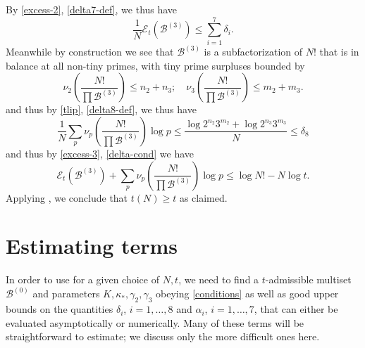 \documentclass[12pt,a4paper,reqno]{amsart}
\numberwithin{equation}{section}
\theoremstyle{plain}
\theoremstyle{definition}
\newcommand\tuple{{\mathcal B}}
\newcommand\excess{{\mathcal{E}}}
\begin{document}
By \eqref{excess-2}, \eqref{delta7-def}, we thus have
\begin{equation}\label{excess-3}
 \frac{1}{N} \excess_t(\tuple^{(3)}) \leq \sum_{i=1}^7 \delta_i.
\end{equation}
Meanwhile by construction we see that $\tuple^{(3)}$ is a subfactorization of $N!$ that is in balance at all non-tiny primes, with tiny prime surpluses bounded by
$$ \nu_2\left( \frac{N!}{\prod \tuple^{(3)}}\right) \leq n_2+n_3; \quad \nu_3\left( \frac{N!}{\prod \tuple^{(3)}}\right) \leq m_2+m_3.$$
and thus by \eqref{tlip}, \eqref{delta8-def}, we thus have
$$ \frac{1}{N} \sum_p \nu_p\left( \frac{N!}{\prod \tuple^{(3)}}\right) \log p \leq \frac{\log 2^{n_2} 3^{m_2} + \log 2^{n_3} 3^{m_3}}{N} \leq \delta_8$$
and thus by \eqref{excess-3}, \eqref{delta-cond} we have
$$ \excess_t(\tuple^{(3)}) + \sum_p \nu_p\left( \frac{N!}{\prod \tuple^{(3)}}\right) \log p \leq \log N! - N \log t.$$
Applying , we conclude that $t(N) \geq t$ as claimed.

\FloatBarrier

\section{Estimating terms}\label{construction-sec}

In order to use  for a given choice of $N,t$, we need to find a $t$-admissible multiset $\tuple^{(0)}$ and parameters $K, \kappa_*, \gamma_2, \gamma_3$ obeying \eqref{conditions} as well as good upper bounds on the quantities $\delta_i$, $i=1,\dots,8$ and $\alpha_i$, $i=1,\dots,7$, that can either be evaluated asymptotically or numerically.  Many of these terms will be straightforward to estimate; we discuss only the more difficult ones here.
\end{document}
